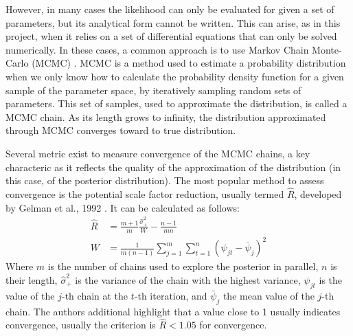 \documentclass[11pt]{article}
\begin{document}
However, in many cases the likelihood can only be evaluated for given a set of parameters, but its analytical form cannot be written. This can arise, as in this project, when it relies on a set of differential equations that can only be solved numerically. In these cases, a common approach is to use Markov Chain Monte-Carlo (MCMC) \cite{mcmcTuto}. MCMC is a method used to estimate a probability distribution when we only know how to calculate the probability density function for a given sample of the parameter space, by iteratively sampling random sets of parameters. This set of samples, used to approximate the distribution, is called a MCMC chain. As its length grows to infinity, the distribution approximated through MCMC converges toward to true distribution. 

Several metric exist to measure convergence of the MCMC chains, a key characteric as it reflects the quality of the approximation of the distribution \cite{moins2023use} (in this case, of the posterior distribution). The most popular method to assess convergence is the potential scale factor reduction, usually termed $\hat{R}$, developed by Gelman et al., 1992 \cite{rhat}. It can be calculated as follows:
\begin{align*}
    \hat{R} &= \frac{m+1}{m}\frac{\hat{\sigma}^2_+}{W}-\frac{n-1}{mn} \\ 
    W &= \frac{1}{m(n-1)}\sum^m_{j=1}\sum^n_{t=1}(\psi_{jt}-\bar{\psi}_j)^2 
\end{align*}
Where $m$ is the number of chains used to explore the posterior in parallel, $n$ is their length, $\hat{\sigma}^2_+$ is the variance of the chain with the highest variance, $\psi_{jt}$ is the value of the $j$-th chain at the $t$-th iteration, and $\bar{\psi}_j$ the mean value of the $j$-th chain. The authors additional highlight that a value close to 1 usually indicates convergence, usually the criterion is $\hat{R}<1.05$ for convergence.
\end{document}
